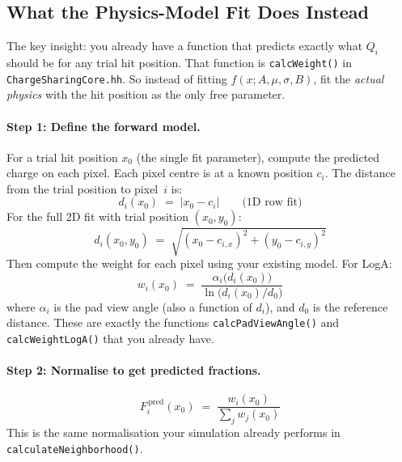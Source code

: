 \documentclass[11pt,a4paper]{article}
\newcommand{\code}[1]{\texttt{#1}}
\newcommand{\file}[1]{\texttt{#1}}
\begin{document}
\subsection{What the Physics-Model Fit Does Instead}
\label{sec:phys-fit}

The key insight: you already have a function that predicts exactly what
$Q_i$ should be for any trial hit position.  That function is
\code{calcWeight()} in \file{ChargeSharingCore.hh}.  So instead of
fitting $f(x; A, \mu, \sigma, B)$, fit the \emph{actual physics} with
the hit position as the only free parameter.

\paragraph{Step 1: Define the forward model.}
For a trial hit position $x_0$ (the single fit parameter), compute the
predicted charge on each pixel.  Each pixel centre is at a known position
$c_i$.  The distance from the trial position to pixel~$i$ is:
\begin{equation}
  d_i(x_0) \;=\; |x_0 - c_i|
  \qquad\text{(1D row fit)}
  \label{eq:dist-1d}
\end{equation}
For the full 2D fit with trial position $(x_0, y_0)$:
\begin{equation}
  d_i(x_0, y_0) \;=\; \sqrt{(x_0 - c_{i,x})^{2} + (y_0 - c_{i,y})^{2}}
  \label{eq:dist-2d}
\end{equation}
Then compute the weight for each pixel using your existing model.  For
LogA:
\begin{equation}
  w_i(x_0) \;=\; \frac{\alpha_i\bigl(d_i(x_0)\bigr)}
                       {\ln\bigl(d_i(x_0) / d_0\bigr)}
  \label{eq:weight-loga}
\end{equation}
where $\alpha_i$ is the pad view angle (also a function of $d_i$), and
$d_0$ is the reference distance.  These are exactly the functions
\code{calcPadViewAngle()} and \code{calcWeightLogA()} that you already
have.

\paragraph{Step 2: Normalise to get predicted fractions.}
\begin{equation}
  F_i^{\,\text{pred}}(x_0) \;=\;
    \frac{w_i(x_0)}{\displaystyle\sum_{j} w_j(x_0)}
  \label{eq:fraction}
\end{equation}
This is the same normalisation your simulation already performs in
\code{calculateNeighborhood()}.
\end{document}
